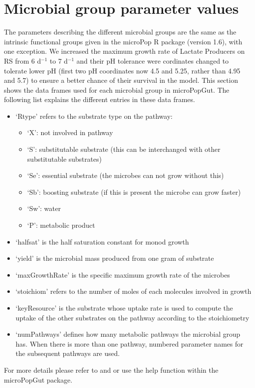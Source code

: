 \documentclass[a4paper]{article}
\begin{document}
\section{Microbial group parameter values}
The parameters describing the different microbial groups are the same as the intrinsic functional groups given in the microPop R package (version 1.6), with one exception. We increased the maximum growth rate of Lactate Producers on RS from 6  d$^{-1}$ to 7  d$^{-1}$ and their pH tolerance were cordinates changed to tolerate lower pH (first two pH coordinates now 4.5 and 5.25, rather than 4.95 and 5.7) to ensure a better chance of their survival in the model. 
This section shows the data frames used for each microbial group in microPopGut. The following list explains the different entries in these data frames.
\begin{itemize}
\item `Rtype' refers to the substrate type on the pathway:
\begin{itemize}
\item `X': not involved in pathway
\item `S': substitutable substrate (this can be interchanged with other substitutable substrates)
\item `Se': essential substrate (the microbes can not grow without this)
\item `Sb': boosting substrate (if this is present the microbe can grow faster) 
\item `Sw': water
\item `P': metabolic product
\end{itemize}
\item `halfsat' is the half saturation constant for monod growth
\item `yield' is the microbial mass produced from one gram of substrate
\item `maxGrowthRate' is the specific maximum growth rate of the microbes 
\item `stoichiom' refers to the number of moles of each molecules involved in growth
\item `keyResource' is the substrate whose uptake rate is used to compute the uptake of the other substrates on the pathway according to the stoichiometry
\item `numPathways' defines how many metabolic pathways the microbial group has. 
When there is more than one pathway, numbered parameter names for the subsequent pathways are used.
\end{itemize}
For more details please refer to \cite{Kettle2015} and \cite{Kettle2018} or use the help function within the microPopGut package.
\end{document}
